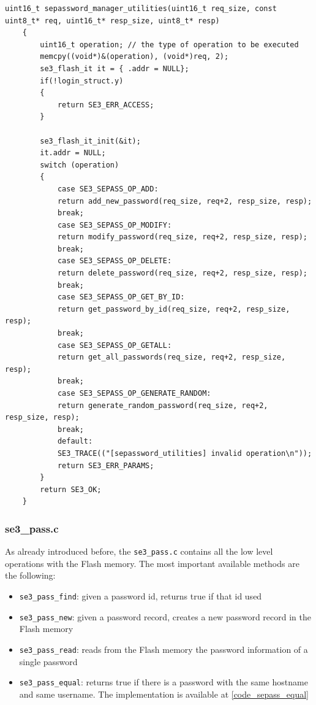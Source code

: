 \begin{lstlisting}[style=CStyle,caption="Code for searching if password record is already present", label=code_command_disp,breaklines=true]
	uint16_t sepassword_manager_utilities(uint16_t req_size, const uint8_t* req, uint16_t* resp_size, uint8_t* resp)
	{
		uint16_t operation; // the type of operation to be executed
		memcpy((void*)&(operation), (void*)req, 2);
		se3_flash_it it = { .addr = NULL};
		if(!login_struct.y)
		{
			return SE3_ERR_ACCESS;
		}
		
		se3_flash_it_init(&it);
		it.addr = NULL;
		switch (operation)
		{
			case SE3_SEPASS_OP_ADD:
			return add_new_password(req_size, req+2, resp_size, resp);
			break;
			case SE3_SEPASS_OP_MODIFY:
			return modify_password(req_size, req+2, resp_size, resp);
			break;
			case SE3_SEPASS_OP_DELETE:
			return delete_password(req_size, req+2, resp_size, resp);
			break;
			case SE3_SEPASS_OP_GET_BY_ID:
			return get_password_by_id(req_size, req+2, resp_size, resp);
			break;
			case SE3_SEPASS_OP_GETALL:
			return get_all_passwords(req_size, req+2, resp_size, resp);
			break;
			case SE3_SEPASS_OP_GENERATE_RANDOM:
			return generate_random_password(req_size, req+2, resp_size, resp);
			break;
			default:
			SE3_TRACE(("[sepassword_utilities] invalid operation\n"));
			return SE3_ERR_PARAMS;
		}
		return SE3_OK;
	}	
\end{lstlisting}



\subsubsection{se3\_pass.c}
As already introduced before, the \texttt{se3\_pass.c} contains all the low level operations with the Flash memory. The most important available methods are the following:
\begin{itemize}
	\item \texttt{se3\_pass\_find}: given a password id, returns true if that id used
	\item \texttt{se3\_pass\_new}: given a password record, creates a new password record in the Flash memory
	\item \texttt{se3\_pass\_read}: reads from the Flash memory the password information of a single password
	\item \texttt{se3\_pass\_equal}: returns true if there is a password with the same hostname and same username. The implementation is available at \ref{code_sepass_equal}
\end{itemize}


